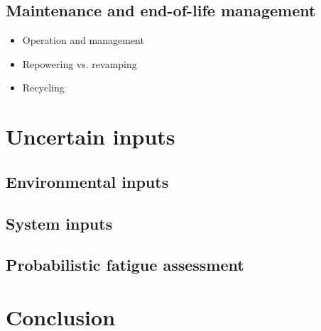 \subsection{Maintenance and end-of-life management}
\begin{itemize}
    \item Operation and management
    \item Repowering vs. revamping
    \item Recycling 
\end{itemize}


\section{Uncertain inputs} \label{sec:owt_uncertainties}

\subsection{Environmental inputs}


\subsection{System inputs}


\subsection{Probabilistic fatigue assessment}




\section{Conclusion}
